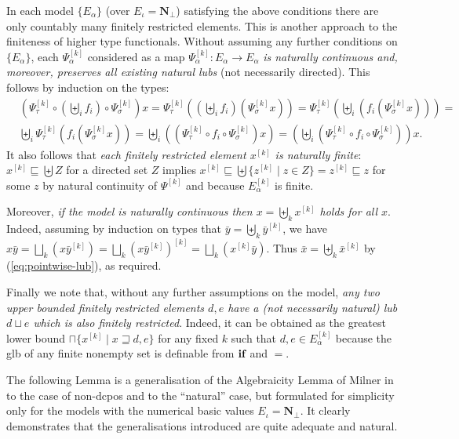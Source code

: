 \documentclass[fleqn]{LMCS}
\theoremstyle{plain}\newtheorem{satz}[thm]{Satz}
\theoremstyle{plain}\newtheorem{hyp}[thm]{Hypothesis}
\theoremstyle{plain}\newtheorem{hyps}[thm]{Hypotheses}
\theoremstyle{definition}\newtheorem{note}[thm]{Note}
\newcommand{\setof}[1]{\{#1\}}
\newcommand{\pointwiselub}{\biguplus}
\newcommand{\arr}{\rightarrow}
\newcommand{\NN}{\mathbf{N}}
\newcommand{\IF}{\mbox{\bf if}}
\newcommand{\Undef}{{\perp}}
\newcommand{\bx}{\bar{x}}
\newcommand{\bY}{\bar{y}}
\newcommand{\?}{\mbox{?}}
\begin{document}
In each model $\setof{E_\alpha}$ (over $E_\iota=\NN_\Undef$) 
satisfying the above conditions 
there are only countably many finitely restricted elements. 
This is another approach to the finiteness 
of higher type functionals.
Without assuming any further conditions on $\setof{E_\alpha}$, 
each $\Psi^{[k]}_\alpha$ considered as a map 
\mbox{$\Psi^{[k]}_\alpha:E_\alpha\arr E_\alpha$} 
\emph{is naturally continuous and, moreover, 
preserves all existing natural  lubs} (not necessarily directed). 
This follows by induction on the types: 
\begin{align*}
&(\Psi^{[k]}_\tau{}\circ(\pointwiselub_i f_i)\circ{\Psi^{[k]}_\sigma})x
=\Psi^{[k]}_\tau((\pointwiselub_i f_i)(\Psi^{[k]}_\sigma x))
=\Psi^{[k]}_\tau(\pointwiselub_i (f_i(\Psi^{[k]}_\sigma x)))=
\\
&\pointwiselub_i\Psi^{[k]}_\tau(f_i(\Psi^{[k]}_\sigma x))
=\pointwiselub_i((\Psi^{[k]}_\tau\circ f_i\circ\Psi^{[k]}_\sigma) x)
=(\pointwiselub_i(\Psi^{[k]}_\tau\circ f_i\circ\Psi^{[k]}_\sigma)) x.  
\end{align*}
It also follows that \emph{each finitely restricted element 
$x^{[k]}$ is naturally finite}: 
$x^{[k]}\sqsubseteq\pointwiselub Z$ for a directed set $Z$ 
implies $x^{[k]}\sqsubseteq\pointwiselub\setof{z^{[k]}\mid z\in Z}=z^{[k]}\sqsubseteq z$ 
for some $z$ by natural  continuity of $\Psi^{[k]}$ 
and because $E^{[k]}_\alpha$ is finite. 

Moreover, \emph{if the model is naturally continuous then
$x=\pointwiselub_k x^{[k]}$ holds for all $x$}. 
Indeed, assuming by induction on types that $\bY=\pointwiselub_k\bY^{[k]}$, 
we have
$x\bY=\bigsqcup_k (x\bY^{[k]})=\bigsqcup_k (x\bY^{[k]})^{[k]}=\bigsqcup_k (x^{[k]}\bY)$. 
Thus $\bx=\pointwiselub_k\bx^{[k]}$ by (\ref{eq:pointwise-lub}), as required. 

Finally we note that, without any further assumptions on the model, 
\emph{any two upper bounded finitely restricted elements $d,e$ 
have a (not necessarily natural) lub $d\sqcup e$ which is also finitely restricted}. 
Indeed, it can be obtained as the greatest lower bound 
$\sqcap\setof{x^{[k]}\mid x\sqsupseteq d,e}$ 
for any fixed $k$ such that $d,e\in E_\alpha^{[k]}$ 
because the glb of any finite nonempty set is definable from $\IF$ and $=$. 


The following Lemma is a generalisation of the Algebraicity Lemma of Milner 
in \cite{Milner77} to the case of non-dcpos and to the ``natural'' case, 
but formulated for simplicity only for the models with the numerical basic values 
$E_\iota=\NN_\Undef$. 
It clearly demonstrates that the generalisations introduced are 
quite adequate and natural. 
\end{document}

